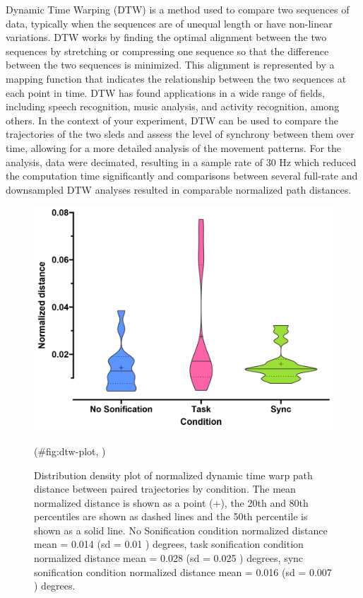 \documentclass[10pt,a4paper,onecolumn]{article}
\begin{document}
Dynamic Time Warping (DTW) is a method used to compare two sequences of data, typically when the sequences are of unequal length or have non-linear variations. DTW works by finding the optimal alignment between the two sequences by stretching or compressing one sequence so that the difference between the two sequences is minimized. This alignment is represented by a mapping function that indicates the relationship between the two sequences at each point in time. DTW has found applications in a wide range of fields, including speech recognition, music analysis, and activity recognition, among others. In the context of your experiment, DTW can be used to compare the trajectories of the two sleds and assess the level of synchrony between them over time, allowing for a more detailed analysis of the movement patterns. For the analysis, data were decimated, resulting in a sample rate of 30 Hz which reduced the computation time significantly and comparisons between several full-rate and downsampled DTW analyses resulted in comparable normalized path distances.

\begin{figure}[h]

{\centering \includegraphics[width=1\linewidth]{figures/dtw_summary} 

}

\caption{Distribution density plot of normalized dynamic time warp path distance between paired trajectories by condition. The mean normalized distance is shown as a point (+), the 20th and 80th percentiles are shown as dashed lines and the 50th percentile is shown as a solid line. No Sonification condition normalized distance mean  =  0.014 (sd =  0.01 ) degrees, task sonification condition normalized distance mean =  0.028 (sd =  0.025 ) degrees, sync sonification condition normalized distance mean =  0.016 (sd =  0.007 ) degrees.}(\#fig:dtw-plot, )
\end{figure}
\end{document}
